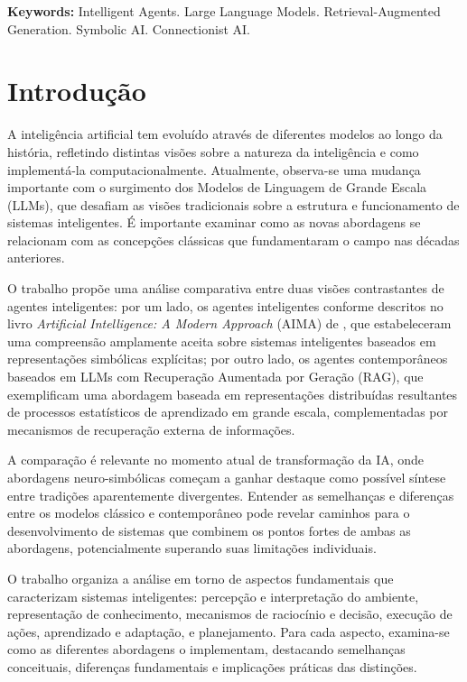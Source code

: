 \documentclass[12pt]{article}
\begin{document}
\noindent
\textbf{Keywords:} Intelligent Agents. Large Language Models. Retrieval-Augmented Generation. Symbolic AI. Connectionist AI.

\newpage

\section{Introdução}

A inteligência artificial tem evoluído através de diferentes modelos ao longo da história, refletindo distintas visões sobre a natureza da inteligência e como implementá-la computacionalmente. Atualmente, observa-se uma mudança importante com o surgimento dos Modelos de Linguagem de Grande Escala (LLMs), que desafiam as visões tradicionais sobre a estrutura e funcionamento de sistemas inteligentes. É importante examinar como as novas abordagens se relacionam com as concepções clássicas que fundamentaram o campo nas décadas anteriores.

O trabalho propõe uma análise comparativa entre duas visões contrastantes de agentes inteligentes: por um lado, os agentes inteligentes conforme descritos no livro \textit{Artificial Intelligence: A Modern Approach} (AIMA) de \citet{russell2010}, que estabeleceram uma compreensão amplamente aceita sobre sistemas inteligentes baseados em representações simbólicas explícitas; por outro lado, os agentes contemporâneos baseados em LLMs com Recuperação Aumentada por Geração (RAG), que exemplificam uma abordagem baseada em representações distribuídas resultantes de processos estatísticos de aprendizado em grande escala, complementadas por mecanismos de recuperação externa de informações.

A comparação é relevante no momento atual de transformação da IA, onde abordagens neuro-simbólicas começam a ganhar destaque como possível síntese entre tradições aparentemente divergentes. Entender as semelhanças e diferenças entre os modelos clássico e contemporâneo pode revelar caminhos para o desenvolvimento de sistemas que combinem os pontos fortes de ambas as abordagens, potencialmente superando suas limitações individuais.

O trabalho organiza a análise em torno de aspectos fundamentais que caracterizam sistemas inteligentes: percepção e interpretação do ambiente, representação de conhecimento, mecanismos de raciocínio e decisão, execução de ações, aprendizado e adaptação, e planejamento. Para cada aspecto, examina-se como as diferentes abordagens o implementam, destacando semelhanças conceituais, diferenças fundamentais e implicações práticas das distinções.
\end{document}
